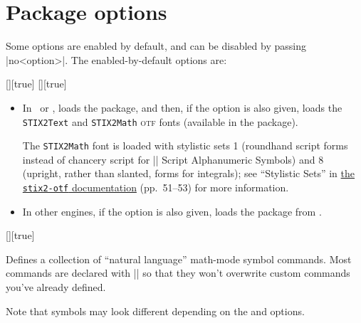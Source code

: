 \documentclass{ltxguidex}
\begin{document}
\vfill
\pagebreak

\section{Package options}

Some options are enabled by default, and can be disabled by passing
|no<option>|. The enabled-by-default options are:
\begin{keys}
  [\bool][true]
  [\bool][true]
    \begin{itemize}
      \item In \XeTeX\ or \LuaTeX, loads the  package, and
        then, if the  option is also given, loads the
        \texttt{STIX2Text} and \texttt{STIX2Math} \textsc{otf} fonts (available
        in the  package).

        The \texttt{STIX2Math} font is loaded with stylistic sets 1 (roundhand
        script forms instead of chancery script for |\mathcal| Script
        Alphanumeric Symbols) and 8 (upright, rather than slanted, forms for
        integrals); see ``Stylistic Sets'' in
        \href{http://mirrors.ctan.org/fonts/stix2-otf/STIXTwoMath-Regular.pdf}{the
        \texttt{stix2-otf} documentation} (pp.~51--53) for more information.

      \item In other engines, if the  option is also given, loads
        the  package from .
    \end{itemize}

  [\bool][true]

    Defines a collection of ``natural language'' math-mode symbol commands.
    Most commands are declared with |\ProvideDocumentCommand| so that they
    won't overwrite custom commands you've already defined.

    Note that symbols may look different depending on the  and
     options.


\end{keys}
\end{document}
